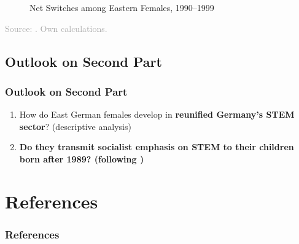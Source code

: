\documentclass[11pt, aspectratio=1610, xcolor={dvipsnames}]{beamer}
\newcommand{\highlight}[1]{\textbf{\textcolor{PineGreen}{#1}}}
\begin{document}
	\begin{frame}
		\frametitle{}
		
		\begin{figure}[h]
			\centering
			\caption{Net Switches among Eastern Females, 1990--1999}
			\label{fig:eastern_female_tracking}
			\resizebox{75mm}{!}{}
		\end{figure}
		
		{\scriptsize
			\textcolor{darkgray}{Source: \cite{SOEP2023}. Own calculations.}
		}
		
	\end{frame}
	
	\subsection{Outlook on Second Part}
	\begin{frame}
		\frametitle{Outlook on Second Part}
		
		\begin{enumerate}
			\item How do East German females develop in \highlight{reunified Germany's STEM sector}? (descriptive analysis)
			\item \textbf{Do they \highlight{transmit} socialist emphasis on STEM to their children born after 1989? (following \cite{Fernandez2011})}
		\end{enumerate}
		
	\end{frame}
	
	\begin{frame}
		\frametitle{}
		
		
		
	\end{frame}
		
	\section*{References}
	\begin{frame}[allowframebreaks]
		\frametitle{References}
		
		{\scriptsize
		
		}
		
	\end{frame}
	
	\appendix
	
\end{document}
